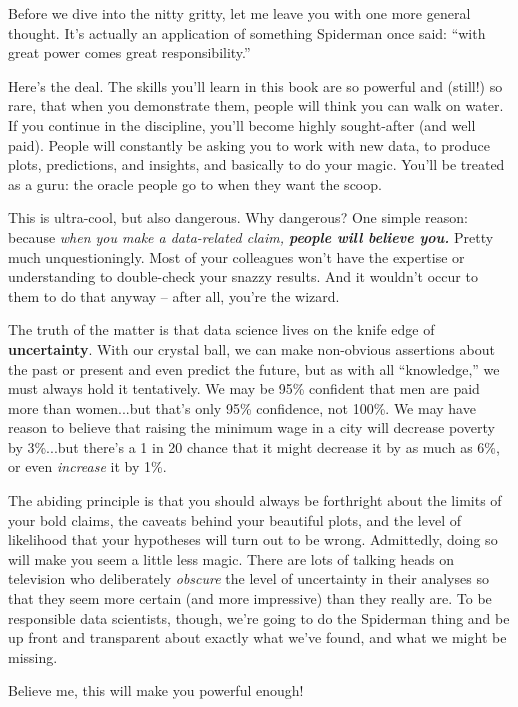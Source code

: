 
Before we dive into the nitty gritty, let me leave you with one more general
thought. It's actually an application of something Spiderman once said: ``with
great power comes great responsibility.''


Here's the deal. The skills you'll learn in this book are so powerful and
(still!) so rare, that when you demonstrate them, people will think you can
walk on water. If you continue in the discipline, you'll become highly
sought-after (and well paid). People will constantly be asking you to work
with new data, to produce plots, predictions, and insights, and basically to do
your magic. You'll be treated as a guru: the oracle people go to when they want
the scoop.

This is ultra-cool, but also dangerous. Why dangerous? One simple reason:
because \textit{when you make a data-related claim, \textbf{people will believe
you.}} Pretty much unquestioningly. Most of your colleagues won't have the
expertise or understanding to double-check your snazzy results. And it wouldn't
occur to them to do that anyway -- after all, you're the wizard.


The truth of the matter is that data science lives on the knife edge of
\textbf{uncertainty}. With our crystal ball, we can make non-obvious assertions
about the past or present and even predict the future, but as with all
``knowledge,'' we must always hold it tentatively. We may be 95\% confident
that men are paid more than women...but that's only 95\% confidence, not 100\%.
We may have reason to believe that raising the minimum wage in a city will
decrease poverty by 3\%...but there's a 1 in 20 chance that it might decrease
it by as much as 6\%, or even \textit{increase} it by 1\%.

The abiding principle is that you should always be forthright about the limits
of your bold claims, the caveats behind your beautiful plots, and the level of
likelihood that your hypotheses will turn out to be wrong. Admittedly, doing so
will make you seem a little less magic. There are lots of talking heads on
television who deliberately \textit{obscure} the level of uncertainty in their
analyses so that they seem more certain (and more impressive) than they really
are. To be responsible data scientists, though, we're going to do the Spiderman
thing and be up front and transparent about exactly what we've found, and what
we might be missing.

Believe me, this will make you powerful enough!
